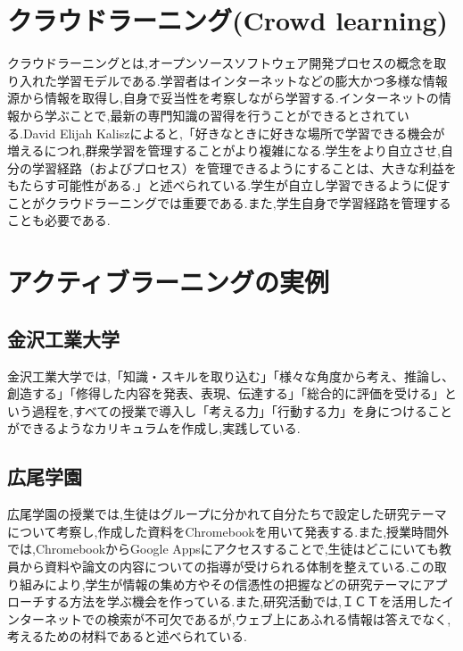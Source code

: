 \documentclass[11pt, a4paper]{jreport}
\begin{document}
\section{クラウドラーニング(Crowd learning)}\label{cl_discription}

クラウドラーニングとは,オープンソースソフトウェア開発プロセスの概念を取り入れた学習モデルである\cite{bib:oss1}.学習者はインターネットなどの膨大かつ多様な情報源から情報を取得し,自身で妥当性を考察しながら学習する.インターネットの情報から学ぶことで,最新の専門知識の習得を行うことができるとされている.David Elijah Kaliszによると,「好きなときに好きな場所で学習できる機会が増えるにつれ,群衆学習を管理することがより複雑になる.学生をより自立させ,自分の学習経路（およびプロセス）を管理できるようにすることは、大きな利益をもたらす可能性がある.」と述べられている\cite{bib:oss2}.学生が自立し学習できるように促すことがクラウドラーニングでは重要である.また,学生自身で学習経路を管理することも必要である.

\section{アクティブラーニングの実例}

\subsection{金沢工業大学}

金沢工業大学では,「知識・スキルを取り込む」「様々な角度から考え、推論し、創造する」「修得した内容を発表、表現、伝達する」「総合的に評価を受ける」という過程を,すべての授業で導入し「考える力」「行動する力」を身につけることができるようなカリキュラムを作成し,実践している\cite{bib:kit}.

\subsection{広尾学園}

広尾学園の授業では,生徒はグループに分かれて自分たちで設定した研究テーマについて考察し,作成した資料をChromebookを用いて発表する.また,授業時間外では,ChromebookからGoogle Appsにアクセスすることで,生徒はどこにいても教員から資料や論文の内容についての指導が受けられる体制を整えている.この取り組みにより,学生が情報の集め方やその信憑性の把握などの研究テーマにアプローチする方法を学ぶ機会を作っている.また,研究活動では,ＩＣＴを活用したインターネットでの検索が不可欠であるが,ウェブ上にあふれる情報は答えでなく,考えるための材料であると述べられている\cite{bib:kitao}.
\end{document}
